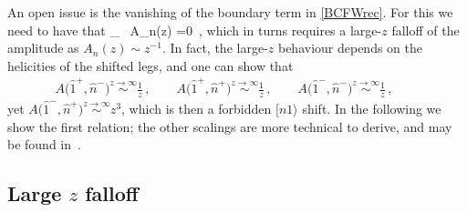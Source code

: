 An open issue is the vanishing of the boundary term in \eqref{BCFWrec}. For this we need to
have that 
\be
{}\oint_{\infty} \, {A_{n}(z)} =0\, , \ee
which in turns requires  a large-$z$ falloff of the amplitude as $A_{n}(z) {\sim} z^{-1}$.
In fact, the large-$z$ behaviour depends on the helicities of the shifted legs, and one can show that
\begin{align}
A\bigl(\hat{1}^{+},\hat{n}^{-}\bigr)\stackrel{z\to \infty }{\sim} \frac{1}{z} \, , \qquad
A\bigl(\hat{1}^{+},\hat{n}^{+}\bigr)\stackrel{z\to \infty }{\sim} \frac{1}{z} \, , \qquad
A\bigl(\hat{1}^{-},\hat{n}^{-}\bigr)\stackrel{z\to \infty }{\sim} \frac{1}{z} \, , \qquad
\end{align}
yet $A\bigl(\hat{1}^{-},\hat{n}^{+}\bigr)\!\stackrel{z\to \infty }{\sim}\!z^{3}$, which is then a forbidden $[n1\rangle$ shift.
In the following we show the first  relation; the other scalings are more technical to derive,
and may be found in~\cite{ch2_Arkani-Hamed:2008bsc}.

\subsection{Large $z$ falloff}

